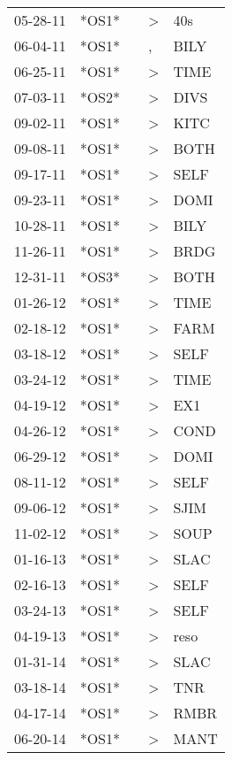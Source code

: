\begin{supertabular}{lllll}
 05-28-11 &  *OS1* &   &  \textgreater &   40s \\
 06-04-11 &  *OS1* &   &             , &  BILY \\
 06-25-11 &  *OS1* &   &  \textgreater &  TIME \\
 07-03-11 &  *OS2* &   &  \textgreater &  DIVS \\
 09-02-11 &  *OS1* &   &  \textgreater &  KITC \\
 09-08-11 &  *OS1* &   &  \textgreater &  BOTH \\
 09-17-11 &  *OS1* &   &  \textgreater &  SELF \\
 09-23-11 &  *OS1* &   &  \textgreater &  DOMI \\
 10-28-11 &  *OS1* &   &  \textgreater &  BILY \\
 11-26-11 &  *OS1* &   &  \textgreater &  BRDG \\
 12-31-11 &  *OS3* &   &  \textgreater &  BOTH \\
 01-26-12 &  *OS1* &   &  \textgreater &  TIME \\
 02-18-12 &  *OS1* &   &  \textgreater &  FARM \\
 03-18-12 &  *OS1* &   &  \textgreater &  SELF \\
 03-24-12 &  *OS1* &   &  \textgreater &  TIME \\
 04-19-12 &  *OS1* &   &  \textgreater &   EX1 \\
 04-26-12 &  *OS1* &   &  \textgreater &  COND \\
 06-29-12 &  *OS1* &   &  \textgreater &  DOMI \\
 08-11-12 &  *OS1* &   &  \textgreater &  SELF \\
 09-06-12 &  *OS1* &   &  \textgreater &  SJIM \\
 11-02-12 &  *OS1* &   &  \textgreater &  SOUP \\
 01-16-13 &  *OS1* &   &  \textgreater &  SLAC \\
 02-16-13 &  *OS1* &   &  \textgreater &  SELF \\
 03-24-13 &  *OS1* &   &  \textgreater &  SELF \\
 04-19-13 &  *OS1* &   &  \textgreater &  reso \\
 01-31-14 &  *OS1* &   &  \textgreater &  SLAC \\
 03-18-14 &  *OS1* &   &  \textgreater &   TNR \\
 04-17-14 &  *OS1* &   &  \textgreater &  RMBR \\
 06-20-14 &  *OS1* &   &  \textgreater &  MANT \\

\end{supertabular}
